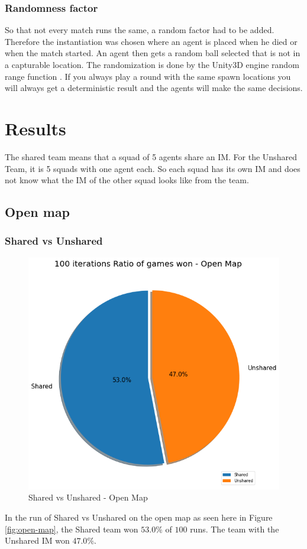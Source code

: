 \documentclass[]{report}
\begin{document}
		\subsection{Randomness factor} \label{ssec:rf}
		So that not every match runs the same, a random factor had to be added. Therefore the instantiation was chosen where an agent is placed when he died or when the match started. An agent then gets a random ball selected that is not in a capturable location. The randomization is done by the Unity3D engine random range function \citep{technologiesUnityRandomRange}. If you always play a round with the same spawn locations you will always get a deterministic result and the agents will make the same decisions.
		
		\clearpage
		\chapter{Results}
		The shared team means that a squad of 5 agents share an \ac{IM}. For the Unshared Team, it is 5 squads with one agent each. So each squad has its own \ac{IM} and does not know what the \ac{IM} of the other squad looks like from the team. 
		\section{Open map}
		\subsection{Shared vs Unshared}
		\begin{figure}[h!]
			\centering
			\includegraphics[width=0.9\linewidth]{"Images/100 Games Shared vs Unshared Open Map"}
			\caption[Shared vs Unshared - Open Map]{Shared vs Unshared - Open Map}
			\label{fig:100-games-shared-vs-unshared-open-map}
		\end{figure}
	In the run of Shared vs Unshared on the open map as seen here in Figure \ref{fig:open-map}, the Shared team won $53.0\%$ of $100$ runs. The team with the Unshared \ac{IM} won $47.0\%$.
		
\end{document}
